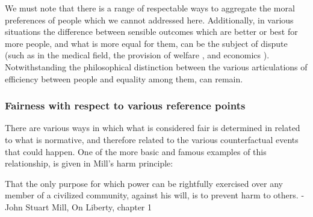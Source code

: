 We must note that there is a range of respectable ways to aggregate the moral preferences of people which we cannot addressed here.
Additionally, in various situations the difference between sensible outcomes which are better or best for more people, and what is more equal for them, can be the subject of dispute (such as in the medical field\cite{Reidpath2012,RePEc:chy:respap:120cherp}, the provision of welfare \cite{10.2307/27522452}, and economics \cite{10.1093/oep/gpz040}). Notwithstanding the philosophical distinction between the various articulations of efficiency between people and equality among them, can remain.



\subsubsection{Fairness with respect to various reference points}\label{sec:reference_points}

There are various ways in which what is considered fair is determined in related to what is normative, and therefore related to the various counterfactual events that could happen.
One of the more basic and famous examples of this relationship, is given in Mill's harm principle:

\begin{displayquote}
That the only purpose for which power can be rightfully exercised over any member of a civilized community, against his will, is to prevent harm to others. - John Stuart Mill, On Liberty, chapter 1 \cite{Mill2Gutenberg}
\end{displayquote}

